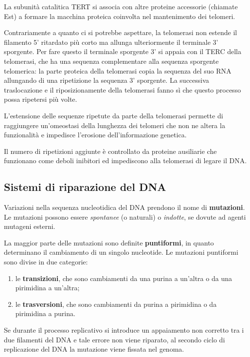 \documentclass[]{article}
\begin{document}
La subunità catalitica TERT si associa con altre proteine accessorie
(chiamate Est) a formare la macchina proteica coinvolta nel mantenimento
dei telomeri.

Contrariamente a quanto ci si potrebbe aspettare, la telomerasi non
estende il filamento 5' ritardato più corto ma allunga ulteriormente il
terminale 3' sporgente. Per fare questo il terminale sporgente 3' si
appaia con il TERC della telomerasi, che ha una sequenza complementare
alla sequenza sporgente telomerica: la parte proteica della telomerasi
copia la sequenza del suo RNA allungando di una ripetizione la sequenza
3' sporgente. La successiva traslocazione e il riposizionamente della
telomerasi fanno sì che questo processo possa ripetersi più volte.

L'estensione delle sequenze ripetute da parte della telomerasi permette
di raggiungere un'omeostasi della lunghezza dei telomeri che non ne
altera la funzionalità e impedisce l'erosione dell'informazione
genetica.

Il numero di ripetizioni aggiunte è controllato da proteine ausiliarie
che funzionano come deboli inibitori ed impediscono alla telomerasi di
legare il DNA.

\subsection{Sistemi di riparazione del
DNA}\label{sistemi-di-riparazione-del-dna}

Variazioni nella sequenza nucleotidica del DNA prendono il nome di
\textbf{mutazioni}. Le mutazioni possono essere \emph{spontanee} (o
naturali) o \emph{indotte}, se dovute ad agenti mutageni esterni.

La maggior parte delle mutazioni sono definite \textbf{puntiformi}, in
quanto determinano il cambiamento di un singolo nucleotide. Le mutazioni
puntiformi sono divise in due categorie:

\begin{enumerate}
\def\labelenumi{\arabic{enumi}.}
\itemsep1pt\parskip0pt
\item
  le \textbf{transizioni}, che sono cambiamenti da una purina a un'altra
  o da una pirimidina a un'altra;
\item
  le \textbf{trasversioni}, che sono cambiamenti da purina a pirimidina
  o da pirimidina a purina.
\end{enumerate}

Se durante il processo replicativo si introduce un appaiamento non
corretto tra i due filamenti del DNA e tale errore non viene riparato,
al secondo ciclo di replicazione del DNA la mutazione viene fissata nel
genoma.
\end{document}
